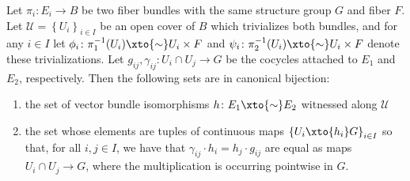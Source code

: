 \documentclass[11pt]{book}
\begin{document}
\begin{theorem}\label{thm:fiber-bundle-iso} Let $\pi_i \colon E_i \to B$ be two fiber bundles with the same structure group $G$ and fiber $F$. Let $\mathcal{U} = \left\{ U_i \right\}_{i \in I}$ be an open cover of $B$ which trivializes both bundles, and for any $i \in I$ let $\phi_i \colon \pi_1^{-1}(U_i) \xto{\sim} U_i \times F$ and $\psi_i \colon \pi_2^{-1}(U_i) \xto{\sim} U_i \times F$ denote these trivializations. Let $g_{ij}, \gamma_{ij} \colon U_i\cap U_j \to G$ be the cocycles attached to $E_1$ and $E_2$, respectively. Then the following sets are in canonical bijection:
\begin{enumerate}
    \item the set of vector bundle isomorphisms $h \colon E_1 \xto{\sim} E_2$ witnessed along $\mathcal{U}$
    \item the set whose elements are tuples of continuous maps $\left\{ U_i \xto{h_i} G \right\}_{i\in I}$ so that, for all $i,j \in I$, we have that $\gamma_{ij}\cdot h_i = h_j \cdot g_{ij}$ are equal as maps $U_i \cap U_j \to G$, where the multiplication is occurring pointwise in $G$.
\end{enumerate}
\end{theorem}
\end{document}
